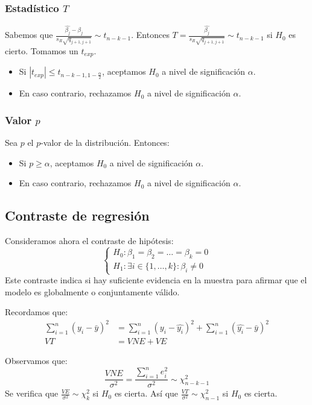\documentclass{report}
\theoremstyle{remark}
\theoremstyle{remark}
\theoremstyle{remark}
\theoremstyle{definition}
\theoremstyle{definition}
\theoremstyle{definition}
\begin{document}
\subsubsection*{Estadístico $T$}
Sabemos que $\frac{\hat{\beta_j} - \beta_j}{s_R \sqrt{q_{j+1, j+1}}} \sim t_{n-k-1}$.
Entonces $T = \frac{\hat{\beta_j}}{s_R \sqrt{q_{j+1, j+1}}} \sim t_{n-k-1}$ si $H_0$ es cierto.
Tomamos un $t_{exp}$.
\begin{itemize}
    \item Si $|t_{exp}| \leq t_{n-k-1, 1-\frac{\alpha}{2}}$, aceptamos $H_0$ a nivel de significación $\alpha$.
    \item En caso contrario, rechazamos $H_0$ a nivel de significación $\alpha$.
\end{itemize}

\subsubsection*{Valor $p$}
Sea $p$ el $p$-valor de la distribución. Entonces:
\begin{itemize}
    \item Si $p \geq \alpha$, aceptamos $H_0$ a nivel de significación $\alpha$.
    \item En caso contrario, rechazamos $H_0$ a nivel de significación $\alpha$.
\end{itemize}

\subsection*{Contraste de regresión}
Consideramos ahora el contraste de hipótesis:
$$\begin{cases}
        H_0: \beta_1 = \beta_2 = \dots = \beta_k = 0 \\
        H_1: \exists i \in \{1, \dots, k\} : \beta_i \neq 0
    \end{cases}$$
Este contraste indica si hay suficiente evidencia en la muestra para afirmar que el modelo es globalmente o conjuntamente válido.

Recordamos que:
\begin{align*}
    \sum_{i=1}^n (y_i - \bar{y})^2 & = \sum_{i=1}^n (y_i - \hat{y_i})^2 + \sum_{i=1}^n (\hat{y_i} - \bar{y})^2 \\
    VT                             & = VNE + VE
\end{align*}

Observamos que:
$$\frac{VNE}{\sigma^2} = \frac{\sum_{i=1}^n e_i^2}{\sigma^2} \sim \chi^2_{n-k-1}$$
Se verifica que $\frac{VE}{\sigma^2} \sim \chi^2_k$ si $H_0$ es cierta.
Así que $\frac{VT}{\sigma^2} \sim \chi^2_{n-1}$ si $H_0$ es cierta.
\end{document}
